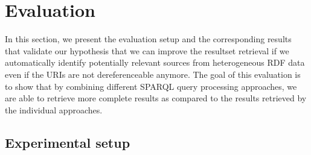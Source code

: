 \section{Evaluation}
\label{sec:eval}
In this section, we present the evaluation setup and the corresponding results that validate our hypothesis that we can improve the resultset retrieval if we automatically identify potentially relevant sources from heterogeneous RDF data even if the URIs are not dereferenceable anymore. The goal of this evaluation is to show that by combining different SPARQL query processing approaches, we are able to retrieve more complete results as compared to the results retrieved by the individual approaches. 
\subsection{Experimental setup}

